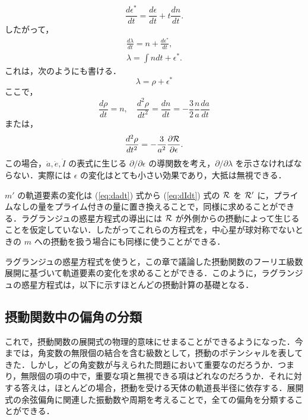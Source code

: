 \documentclass[11pt,a4paper,oneside,onecolumn]{jreport}
\begin{document}
\begin{equation}
\frac{d \epsilon^{\ast}}{d t} = \frac{d \epsilon}{d t} + t \frac{d n}{d t}.
\end{equation}
したがって，
\begin{eqnarray}
\frac{d \lambda}{d t} = n + \frac{d \epsilon^{\ast}}{d t}, \\
\lambda = \int n d t + \epsilon^{\ast}.
\end{eqnarray}
これは，次のようにも書ける．
\begin{equation}
\lambda = \rho + \epsilon^{\ast}
\end{equation}
ここで，
\begin{equation}
\frac{d \rho}{d t} = n, \quad \frac{d^2 \rho}{d t^2} = \frac{d n}{d t} = - \frac{3}{2} \frac{n}{a} \frac{d a}{d t}
\end{equation}
または，
\begin{equation}
\frac{d^2 \rho}{d t^2} = - \frac{3}{a^2} \frac{\partial {\cal R}}{\partial \epsilon}.
\end{equation}
この場合，$\dot{a}, \dot{e}, \dot{I}$ の表式に生じる $\partial / \partial \epsilon$ の導関数を考え，$\partial / \partial \lambda$ を示さなければならない．実際には $\epsilon$ の変化はとても小さい効果であり，大抵は無視できる．

$m'$ の軌道要素の変化は (\ref{eq:dadt}) 式から (\ref{eq:dIdt}) 式の ${\cal R}$ を ${\cal R'}$ に，プライムなしの量をプライム付きの量に置き換えることで，同様に求めることができる．ラグランジュの惑星方程式の導出には ${\cal R}$ が外側からの摂動によって生じることを仮定していない．したがってこれらの方程式を，中心星が球対称でないときの $m$ への摂動を扱う場合にも同様に使うことができる．

ラグランジュの惑星方程式を使うと，この章で議論した摂動関数のフーリエ級数展開に基づいて軌道要素の変化を求めることができる．このように，ラグランジュの惑星方程式は，以下に示すほとんどの摂動計算の基礎となる．

\subsection{摂動関数中の偏角の分類}
これで，摂動関数の展開式の物理的意味にせまることができるようになった．今までは，角変数の無限個の結合を含む級数として，摂動のポテンシャルを表してきた．しかし，どの角変数が与えられた問題において重要なのだろうか．つまり，無限個の項の中で，重要な項と無視できる項はどれなのだろうか．それに対する答えは，ほとんどの場合，摂動を受ける天体の軌道長半径に依存する．展開式の余弦偏角に関連した振動数や周期を考えることで，全ての偏角を分類することができる．
\end{document}
